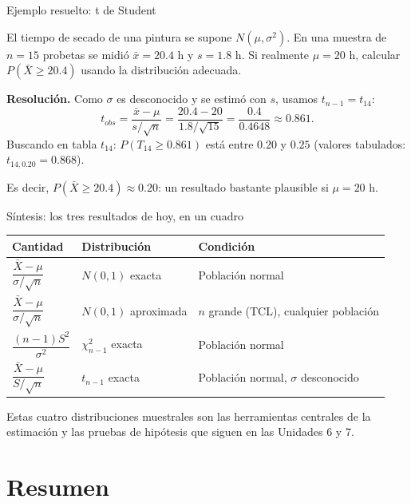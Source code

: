 \documentclass[aspectratio=169,11pt]{beamer}
\begin{document}
\begin{frame}{Ejemplo resuelto: t de Student}
\begin{example}
El tiempo de secado de una pintura se supone $N(\mu,\sigma^2)$. En una muestra de $n=15$ probetas se midió $\bar x = 20.4$ h y $s=1.8$ h. Si realmente $\mu=20$ h, calcular $P(\bar X \geq 20.4)$ usando la distribución adecuada.

\textbf{Resolución.} Como $\sigma$ es desconocido y se estimó con $s$, usamos $t_{n-1}=t_{14}$:
$$t_{obs} = \frac{\bar x-\mu}{s/\sqrt n} = \frac{20.4-20}{1.8/\sqrt{15}} = \frac{0.4}{0.4648} \approx 0.861.$$
Buscando en tabla $t_{14}$: $P(T_{14}\geq 0.861)$ está entre $0.20$ y $0.25$ (valores tabulados: $t_{14,0.20}=0.868$).

Es decir, $P(\bar X\geq 20.4) \approx 0.20$: un resultado bastante plausible si $\mu=20$ h.
\end{example}
\end{frame}

\begin{frame}{Síntesis: los tres resultados de hoy, en un cuadro}
\begin{center}
\small
\begin{tabular}{lll}
\toprule
\textbf{Cantidad} & \textbf{Distribución} & \textbf{Condición} \\
\midrule
$\dfrac{\bar X-\mu}{\sigma/\sqrt n}$ & $N(0,1)$ exacta & Población normal \\[1.2em]
$\dfrac{\bar X-\mu}{\sigma/\sqrt n}$ & $N(0,1)$ aproximada & $n$ grande (TCL), cualquier población \\[1.2em]
$\dfrac{(n-1)S^2}{\sigma^2}$ & $\chi^2_{n-1}$ exacta & Población normal \\[1.2em]
$\dfrac{\bar X-\mu}{S/\sqrt n}$ & $t_{n-1}$ exacta & Población normal, $\sigma$ desconocido \\
\bottomrule
\end{tabular}
\end{center}

Estas cuatro distribuciones muestrales son las herramientas centrales de la estimación y las pruebas de hipótesis que siguen en las Unidades 6 y 7.
\end{frame}

\section{Resumen}
\end{document}
